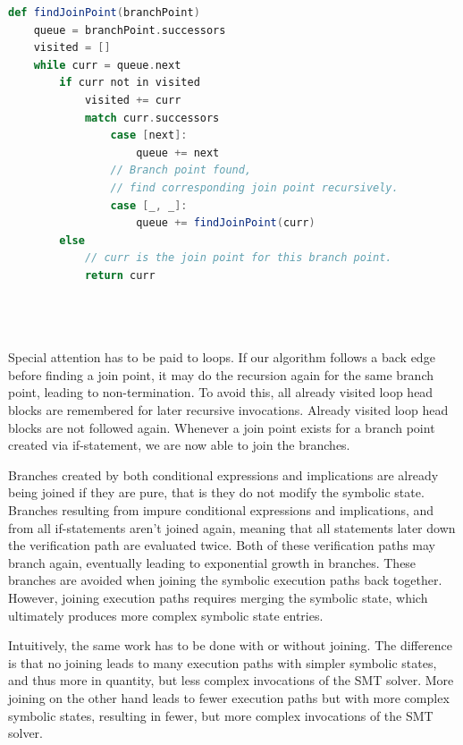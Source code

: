 \documentclass[11pt]{article}
\begin{document}
    \begin{lstlisting}[language=Scala, caption={The join point finding algorithm without support for loops.}, label={lst:join-point-algorithm}]
def findJoinPoint(branchPoint)
    queue = branchPoint.successors
    visited = []
    while curr = queue.next
        if curr not in visited
            visited += curr
            match curr.successors
                case [next]:
                    queue += next
                // Branch point found,
                // find corresponding join point recursively.
                case [_, _]:
                    queue += findJoinPoint(curr)
        else
            // curr is the join point for this branch point.
            return curr

    
        
    \end{lstlisting}

    Special attention has to be paid to loops. If our algorithm follows a back edge before finding a join point,
    it may do the recursion again for the same branch point, leading to non-termination.
    To avoid this, all already visited loop head blocks
    are remembered for later recursive invocations. Already visited loop head blocks are not followed again.
    Whenever a join point exists for a branch point created via if-statement, we are now able
    to join the branches.

    Branches created by both conditional expressions and implications are already being joined if they are pure,
    that is they do not modify the symbolic state.
    Branches resulting from impure conditional expressions and implications,
    and from all if-statements aren't joined again, meaning that
    all statements later down the verification path are evaluated twice. Both of these
    verification paths may branch again, eventually leading to exponential growth in branches.
    These branches are avoided when joining the symbolic execution paths back together.
    However, joining execution paths requires merging the symbolic state, which
    ultimately produces more complex symbolic state entries.

    Intuitively, the same work has to be done with or without joining. The difference is that
    no joining leads
    to many execution paths with simpler symbolic states, and thus more in quantity, but less complex
    invocations of the SMT solver. More joining on the other hand leads to
    fewer execution paths but with more complex symbolic states, resulting in fewer,
    but more complex invocations of the SMT solver.
\end{document}
